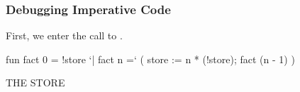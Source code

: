 \documentclass[aspectratio=169]{beamer}
\begin{document}
\begin{frame}[fragile]
  \frametitle{Debugging Imperative Code}

  \begin{minipage}[t][0.6in][t]{\textwidth}
  First, we enter the call to .
  \end{minipage}

  \vspace{10pt}

  \begin{center}
    \begin{minipage}[t][1.7in][t]{0.6\textwidth}
      \vspace{\fill}
      \begin{codeblock}
        fun fact 0 = !store
          `| fact n =`
              ( store := n * (!store);
                fact (n - 1)
              )
      \end{codeblock}
      \vspace{\fill}
    \end{minipage}
    \hfill\vline\hfill
    \begin{minipage}[t][1.7in][t]{0.3\textwidth}
      \centering
      {\hspace{-20pt}\color{gray} \large THE STORE}

      \vspace{\fill}
      \vspace{\fill}
    \end{minipage}
  \end{center}
\end{frame}
\end{document}
